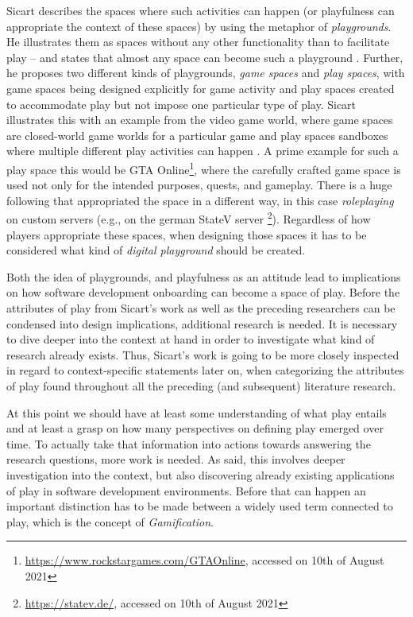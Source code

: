 Sicart describes the spaces where such activities can happen (or playfulness can appropriate the context of these spaces) by using the metaphor of \textit{playgrounds}. He illustrates them as spaces without any other functionality than to facilitate play -- and states that almost any space can become such a playground \cite[p. 7]{sicart2014play}. Further, he proposes two different kinds of playgrounds, \textit{game spaces} and \textit{play spaces}, with game spaces being designed explicitly for game activity and play spaces created to accommodate play but not impose one particular type of play. Sicart illustrates this with an example from the video game world, where game spaces are closed-world game worlds for a particular game and play spaces sandboxes where multiple different play activities can happen \cite[p. 51]{sicart2014play}. A prime example for such a play space this would be GTA Online\footnote{\url{https://www.rockstargames.com/GTAOnline}, accessed on 10th of August 2021}, where the carefully crafted game space is used not only for the intended purposes, quests, and gameplay. There is a huge following that appropriated the space in a different way, in this case \textit{roleplaying} on custom servers (e.g., on the german StateV server \footnote{\url{https://statev.de/}, accessed on 10th of August 2021}). Regardless of how players appropriate these spaces, when designing those spaces it has to be considered what kind of \textit{digital playground} should be created.

Both the idea of playgrounds, and playfulness as an attitude lead to implications on how software development onboarding can become a space of play. Before the attributes of play from Sicart's work as well as the preceding researchers can be condensed into design implications, additional research is needed. It is necessary to dive deeper into the context at hand in order to investigate what kind of research already exists. Thus, Sicart's work is going to be more closely inspected in regard to context-specific statements later on, when categorizing the attributes of play found throughout all the preceding (and subsequent) literature research.

At this point we should have at least some understanding of what play entails and at least a grasp on how many perspectives on defining play emerged over time. To actually take that information into actions towards answering the research questions, more work is needed. As said, this involves deeper investigation into the context, but also discovering already existing applications of play in software development environments. Before that can happen an important distinction has to be made between a widely used term connected to play, which is the concept of \textit{Gamification}.

